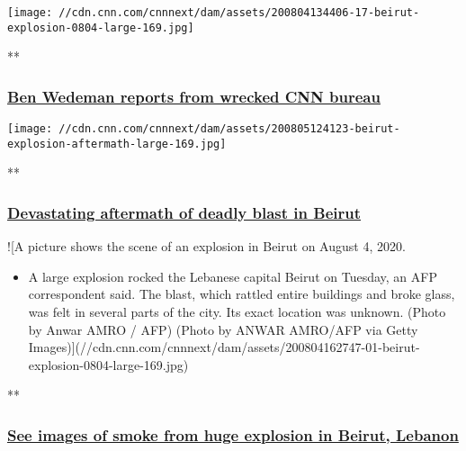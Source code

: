 \texttt{[image: //cdn.cnn.com/cnnnext/dam/assets/200804134406-17-beirut-explosion-0804-large-169.jpg]}

**

\hypertarget{ben-wedeman-reports-from-wrecked-cnn-bureau}{%
\subsubsection{\texorpdfstring{\href{/videos/world/2020/08/04/beirut-lebanon-explosion-ben-wedeman-live-amanpour-vpx.cnn/video/playlists/beirut-explosion/}{Ben
Wedeman reports from wrecked CNN
bureau}}{Ben Wedeman reports from wrecked CNN bureau}}\label{ben-wedeman-reports-from-wrecked-cnn-bureau}}

\href{/videos/world/2020/08/05/lebanon-beirut-explosion-wedeman-pkg-intl-hnk-vpx.cnn/video/playlists/beirut-explosion/}{}

\texttt{[image: //cdn.cnn.com/cnnnext/dam/assets/200805124123-beirut-explosion-aftermath-large-169.jpg]}

**

\hypertarget{devastating-aftermath-of-deadly-blast-in-beirut-}{%
\subsubsection{\texorpdfstring{\href{/videos/world/2020/08/05/lebanon-beirut-explosion-wedeman-pkg-intl-hnk-vpx.cnn/video/playlists/beirut-explosion/}{Devastating
aftermath of deadly blast in Beirut
}}{Devastating aftermath of deadly blast in Beirut }}\label{devastating-aftermath-of-deadly-blast-in-beirut-}}

\href{/videos/world/2020/08/04/beirut-lebanon-explosion-intl-ldn-vpx.cnn/video/playlists/beirut-explosion/}{}

!{[}A picture shows the scene of an explosion in Beirut on August 4,
2020.

\begin{itemize}
\tightlist
\item
  A large explosion rocked the Lebanese capital Beirut on Tuesday, an
  AFP correspondent said. The blast, which rattled entire buildings and
  broke glass, was felt in several parts of the city. Its exact location
  was unknown. (Photo by Anwar AMRO / AFP) (Photo by ANWAR AMRO/AFP via
  Getty
  Images){]}(//cdn.cnn.com/cnnnext/dam/assets/200804162747-01-beirut-explosion-0804-large-169.jpg)
\end{itemize}

**

\hypertarget{see-images-of-smoke-from-huge-explosion-in-beirut-lebanon}{%
\subsubsection{\texorpdfstring{\href{/videos/world/2020/08/04/beirut-lebanon-explosion-intl-ldn-vpx.cnn/video/playlists/beirut-explosion/}{See
images of smoke from huge explosion in Beirut,
Lebanon}}{See images of smoke from huge explosion in Beirut, Lebanon}}\label{see-images-of-smoke-from-huge-explosion-in-beirut-lebanon}}

